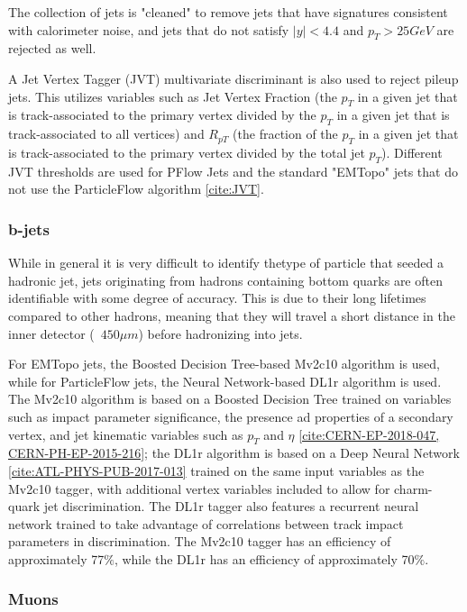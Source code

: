 The collection of jets is "cleaned" to remove jets that have signatures consistent with calorimeter noise, and jets that do not satisfy $|y| < 4.4$ and $p_{T} > 25 GeV$ are rejected as well. 

A Jet Vertex Tagger (JVT) multivariate discriminant is also used to reject pileup jets. This utilizes variables such as Jet Vertex Fraction (the $p_{T}$ in a given jet that is track-associated to the primary vertex divided by the $p_{T}$ in a given jet that is track-associated to all vertices) and $R_{pT}$ (the fraction of the $p_{T}$ in a given jet that is track-associated to the primary vertex divided by the total jet $p_{T}$). Different JVT thresholds are used for PFlow Jets and the standard "EMTopo" jets that do not use the ParticleFlow algorithm \ref{cite:JVT}.

\subsubsection{b-jets} \label{sec:b-jets} 

While in general it is very difficult to identify thetype of particle that seeded a hadronic jet, jets originating from hadrons containing bottom quarks are often identifiable with some degree of accuracy. This is due to their long lifetimes compared to other hadrons, meaning that they will travel a short distance in the inner detector (~$450 \mu m$) before hadronizing into jets. 

For EMTopo jets, the Boosted Decision Tree-based Mv2c10 algorithm is used, while for ParticleFlow jets, the Neural Network-based DL1r algorithm is used. The Mv2c10 algorithm is based on a Boosted Decision Tree trained on variables such as impact parameter significance, the presence ad properties of a secondary vertex, and jet kinematic variables such as $p_{T}$ and $\eta$ \ref{cite:CERN-EP-2018-047, CERN-PH-EP-2015-216}; the DL1r algorithm is based on a Deep Neural Network \ref{cite:ATL-PHYS-PUB-2017-013} trained on the same input variables as the Mv2c10 tagger, with additional vertex variables included to allow for charm-quark jet discrimination. The DL1r tagger also features a recurrent neural network trained to take advantage of correlations between track impact parameters in discrimination. The Mv2c10 tagger has an efficiency of approximately 77$\%$, while the DL1r has an efficiency of approximately 70$\%$.  

\subsubsection{Muons} \label{sec:Muons} 


